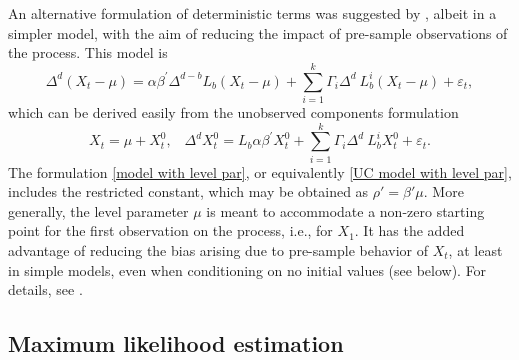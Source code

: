 \documentclass[10pt]{article}
\begin{document}
An alternative formulation of deterministic terms was suggested by \cite{johansen2014initial}, albeit in a simpler model, with the aim of reducing the impact of pre-sample observations of the process. This model is
\begin{equation}
\Delta^{d}(X_{t}-\mu)= \alpha \beta^{\prime} \Delta^{d-b} L_{b} (X_{t}-\mu) + 
\sum_{i=1}^{k}\Gamma_{i}\Delta^{d}\ L_{b}^{i}(X_{t}-\mu)
+ \varepsilon_{t},
\label{model with level par}
\end{equation}
which can be derived easily from the unobserved components formulation
\begin{equation}
X_t = \mu + X_t^0, \; \; \;
\Delta^{d}X_{t}^0=L_{b} \alpha \beta^{\prime} X_{t}^0 + 
\sum_{i=1}^{k}\Gamma_{i}\Delta^{d}\ L_{b}^{i}X_{t}^0
+ \varepsilon_{t}.
\label{UC model with level par}
\end{equation}
The formulation \eqref{model with level par}, or equivalently \eqref{UC model with level par}, includes the restricted constant, which may be obtained as $\rho'=\beta'\mu$. More generally, the level parameter $\mu$ is meant to accommodate a non-zero starting point for the first observation on the process, i.e., for $X_1$. It has the added advantage of reducing the bias arising due to pre-sample behavior of $X_t$, at least in simple models, even when conditioning on no initial values (see below). For details, see \cite{johansen2014initial}.


\subsection{Maximum likelihood estimation}
\end{document}
